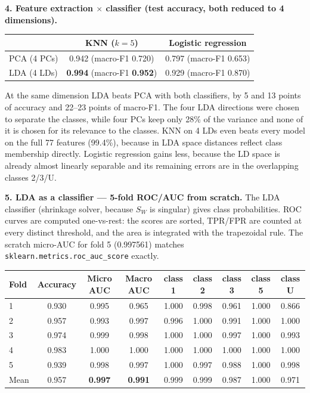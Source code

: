 \documentclass[11pt]{article}
\begin{document}
\textbf{4. Feature extraction $\times$ classifier (test accuracy, both reduced to 4 dimensions).}
\begin{table}[H]\centering
\begin{tabular}{lcc}\toprule
 & KNN ($k=5$) & Logistic regression\\\midrule
PCA (4 PCs) & 0.942 \; (macro-F1 0.720) & 0.797 \; (macro-F1 0.653)\\
LDA (4 LDs) & \textbf{0.994} \; (macro-F1 \textbf{0.952}) & 0.929 \; (macro-F1 0.870)\\\bottomrule
\end{tabular}
\end{table}
At the same dimension LDA beats PCA with both classifiers, by 5 and 13 points of accuracy and 22--23 points of macro-F1.
The four LDA directions were chosen to separate the classes, while four PCs keep only 28\% of the variance and none of it is chosen
for its relevance to the classes. KNN on 4 LDs even beats every model on the full 77 features (99.4\%), because in LDA space distances
reflect class membership directly. Logistic regression gains less, because the LD space is already almost linearly separable and its
remaining errors are in the overlapping classes 2/3/U.

\textbf{5. LDA as a classifier --- 5-fold ROC/AUC from scratch.} The LDA classifier (shrinkage solver, because $S_W$ is singular) gives class
probabilities. ROC curves are computed one-vs-rest: the scores are sorted, TPR/FPR are counted at every distinct threshold, and the
area is integrated with the trapezoidal rule. The scratch micro-AUC for fold 5 (0.997561) matches \texttt{sklearn.metrics.roc\_auc\_score} exactly.

\begin{table}[H]\centering\small
\begin{tabular}{lcccccccc}\toprule
Fold & Accuracy & Micro AUC & Macro AUC & class 1 & class 2 & class 3 & class 5 & class U\\\midrule
1 & 0.930 & 0.995 & 0.965 & 1.000 & 0.998 & 0.961 & 1.000 & 0.866\\
2 & 0.957 & 0.993 & 0.997 & 0.996 & 1.000 & 0.991 & 1.000 & 1.000\\
3 & 0.974 & 0.999 & 0.998 & 1.000 & 1.000 & 0.997 & 1.000 & 0.993\\
4 & 0.983 & 1.000 & 1.000 & 1.000 & 1.000 & 1.000 & 1.000 & 1.000\\
5 & 0.939 & 0.998 & 0.997 & 1.000 & 0.997 & 0.988 & 1.000 & 0.998\\\midrule
Mean & 0.957 & \textbf{0.997} & \textbf{0.991} & 0.999 & 0.999 & 0.987 & 1.000 & 0.971\\\bottomrule
\end{tabular}
\end{table}
\end{document}
